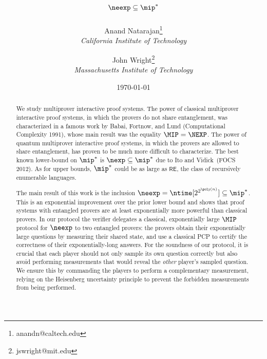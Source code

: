 \documentclass[11pt]{article}
\begin{document}
\title{$\neexp \subseteq \mip^*$\vspace*{10pt}}

\author{Anand Natarajan\thanks{anandn@caltech.edu}\\
 \small{\sl California Institute of Technology} \and John Wright\thanks{jswright@mit.edu}\\ \small{\sl Massachusetts Institute of Technology}\vspace*{10pt}
}

\date{\today}

\maketitle


\begin{abstract}
We study multiprover interactive proof systems.
The power of classical multiprover interactive proof systems,
in which the provers do not share entanglement,
was characterized in a famous work by Babai, Fortnow, and Lund
(Computational Complexity 1991),
whose main result was the equality $\MIP = \NEXP$.
The power of quantum multiprover interactive proof systems,
in which the provers are allowed to share entanglement,
has proven to be much more difficult to characterize.
The best known lower-bound on $\mip^*$ is $\nexp \subseteq \mip^*$ due
to Ito and Vidick~(FOCS 2012).
As for upper bounds, $\mip^*$ could be as large as $\mathsf{RE}$, the class of recursively enumerable languages.

The main result of this work is the inclusion $\neexp = \ntime[2^{2^{\poly(n)}}] \subseteq \mip^*$.
This is an exponential improvement over the prior lower bound
and shows that proof systems with entangled provers are at least exponentially more
powerful than classical provers. In our protocol the verifier
delegates a classical, exponentially large $\MIP$ protocol for
$\neexp$ to two entangled provers: the provers obtain their
exponentially large questions by measuring their shared state, and use
a classical PCP to certify the correctness of their exponentially-long
answers. For the soundness of our protocol, it is
crucial that each player should not only sample its own question correctly
but also avoid performing measurements that would reveal the
\emph{other} player's sampled question. We ensure this by commanding
the players to perform a complementary measurement, relying on the Heisenberg uncertainty
principle to prevent the forbidden measurements from being performed.



\end{abstract}
\end{document}
